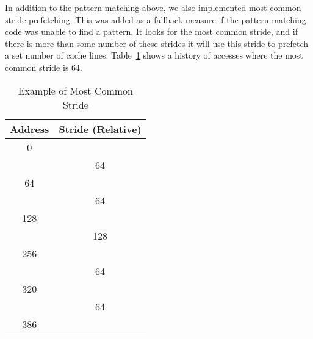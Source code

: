 In addition to the pattern matching above, we also implemented most common stride
prefetching. This was added as a fallback measure if the pattern matching code
was unable to find a pattern. It looks for the most common stride, and if there
is more than some number of these strides it will use this stride to prefetch a
set number of cache lines. Table~\ref{table:mcs} shows a history of accesses
where the most common stride is 64.
\begin{table}
	\caption{Example of Most Common Stride}
	\centering
	\label{table:mcs}
	\begin{tabular}{c|c}
		\bfseries Address & \bfseries Stride (Relative)\\
		\hline
		0   & \\
		    & 64\\
		64  & \\
		    & 64\\
		128 & \\
		    & 128\\
		256 & \\
		    & 64\\
		320 & \\
		    & 64\\
		386 & \\
	\end{tabular}
\end{table}

